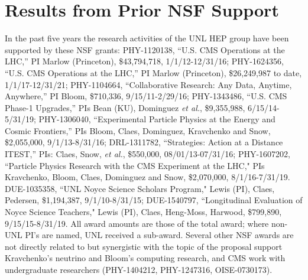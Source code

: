\section{Results from Prior NSF Support}
\label{sec:prior}

In the past five years the research activities of the UNL HEP group have been supported by these NSF grants: 
PHY-1120138, ``U.S. CMS Operations at the LHC,'' PI Marlow (Princeton), \$43,794,718, 1/1/12-12/31/16; 
PHY-1624356, ``U.S. CMS Operations at the LHC,'' PI Marlow (Princeton), \$26,249,987 to date, 1/1/17-12/31/21; 
PHY-1104664, ``Collaborative Research: Any Data, Anytime, Anywhere,'' PI Bloom, \$710,336, 9/15/11-2/29/16;
PHY-1343486, ``U.S. CMS Phase-1 Upgrades,'' PIs Bean (KU), Dominguez {\it et al.}, \$9,355,988, 6/15/14-5/31/19;
PHY-1306040, ``Experimental Particle Physics at the Energy and Cosmic Frontiers,'' PIs Bloom, Claes, Dominguez, Kravchenko and Snow, \$2,055,000, 9/1/13-8/31/16;
DRL-1311782, ``Strategies: Action at a Distance ITEST,'' PIs: Claes, Snow, {\it et al.}, \$550,000, 08/01/13-07/31/16;
PHY-1607202, ``Particle Physics Research with the CMS Experiment at the LHC," PIs Kravchenko, Bloom, Claes, Dominguez and Snow, \$2,070,000, 8/1/16-7/31/19.
DUE-1035358, ``UNL Noyce Science Scholars Program," Lewis (PI), Claes, Pedersen, \$1,194,387, 9/1/10-8/31/15; DUE-1540797, ``Longitudinal Evaluation of Noyce Science Teachers," Lewis (PI), Claes, Heng-Moss, Harwood, \$799,890, 9/15/15-8/31/19.
All award amounts are those of the total award; where non-UNL PI's are named, UNL received a sub-award. Several other NSF awards are not directly related to but synergistic with the topic of the proposal support Kravchenko's neutrino and Bloom's computing research, and CMS work with undergraduate researchers
(PHY-1404212, PHY-1247316, OISE-0730173).

